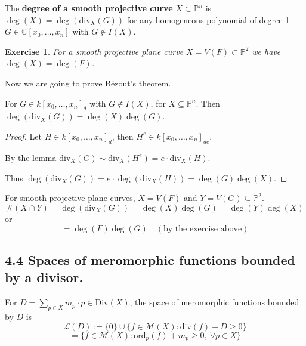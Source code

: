 \documentclass{article}
\newtheorem{exercise}{Exercise}
\begin{document}
\begin{definition}
    The \textbf{degree of a smooth projective curve} $X \subset \mathbb{P}^n$
    is $\deg(X) = \deg(\text{div}_X(G))$ for any homogeneous polynomial of degree 1 $G \in \mathbb{C}[x_0, \dots, x_n]$
    with $G \notin I(X)$.
\end{definition}

\begin{exercise}
    For a smooth projective plane curve $X = V(F) \subset \mathbb{P}^2$
    we have $\deg(X) = \deg(F)$.
\end{exercise}

Now we are going to prove Bézout's theorem.

\begin{proposition}
For $G \in k[x_0, \ldots, x_n]_d$ with $G \notin I(X)$, for $X \subseteq \mathbb{P}^n$.
Then $\deg(\mathrm{div}_X(G)) = \deg(X)\deg(G)$.
\end{proposition}

\begin{proof}
Let $H \in k[x_0, \ldots, x_n]_d$, then $H^e \in k[x_0, \ldots, x_n]_{de}$.

By the lemma $\mathrm{div}_X(G) \sim \mathrm{div}_X(H^e) = e \cdot \mathrm{div}_X(H)$.

Thus $\deg(\mathrm{div}_X(G)) = e \cdot \deg(\mathrm{div}_X(H)) = \deg(G)\deg(X)$.
\end{proof}

\begin{corollary}
For smooth projective plane curves, $X=V(F)$ and $Y=V(G) \subseteq \mathbb{P}^2$.
$$ \#(X \cap Y) = \deg(\mathrm{div}_X(G)) = \deg(X)\deg(G) = \deg(Y)\deg(X) $$
or
$$ = \deg(F)\deg(G) \quad (\text{by the exercise above}) $$
\end{corollary}

\subsection*{4.4 Spaces of meromorphic functions bounded by a divisor.}

\begin{definition}
For $D = \sum_{p \in X} m_p \cdot p \in \mathrm{Div}(X)$, the space of meromorphic functions bounded by $D$ is
$$ \mathcal{L}(D) := \{0\} \cup \{ f \in \mathcal{M}(X) : \mathrm{div}(f)+D \ge 0 \} $$
$$ = \{ f \in \mathcal{M}(X) : \mathrm{ord}_p(f) + m_p \ge 0, \ \forall p \in X \} $$
\end{definition}
\end{document}

